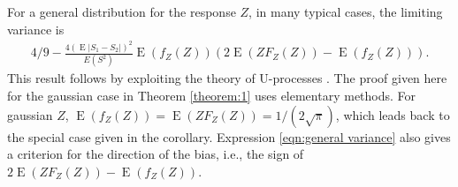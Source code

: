 \documentclass[12pt]{article}
\newtheorem{theorem}{Theorem}
\newcommand{\z}{Z}
\newcommand{\y}{Y}
\newcommand{\s}{S}
\DeclareMathOperator{\diag}{diag}
\DeclareMathOperator{\E}{E}
\DeclareMathOperator{\V}{Var}
\begin{document}
    For a general distribution for the
    response $\z$, in many typical cases, the
    limiting variance is
    \begin{align}
    4/9 - \frac{4(\E|\s_1-\s_2|)^2}{E(\s^2)}\E(f_\z(\z))(2\E(\z F_\z(\z))-\E(f_\z(\z))).\label{eqn:general variance}
    \end{align}
    This result follows by exploiting the theory of U-processes
    \citep{nolan1988}. The proof given here for the gaussian case in Theorem
    \ref{theorem:1} uses elementary methods. For gaussian $\z$,
    $\E(f_\z(\z))=\E(\z F_\z(\z))=1/(2\sqrt{\pi})$, which leads back to the
    special case given in the corollary. Expression \eqref{eqn:general variance} also gives a criterion for the direction of the bias, i.e., the sign of $2\E(\z F_\z(\z))-\E(f_\z(\z))$.
    
\end{document}
